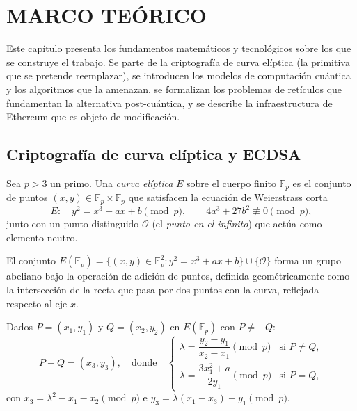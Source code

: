 \chapter{MARCO TEÓRICO}
\label{cap:marco_teorico}

Este capítulo presenta los fundamentos matemáticos y tecnológicos sobre los que se construye el trabajo. Se parte de la criptografía de curva elíptica (la primitiva que se pretende reemplazar), se introducen los modelos de computación cuántica y los algoritmos que la amenazan, se formalizan los problemas de retículos que fundamentan la alternativa post-cuántica, y se describe la infraestructura de Ethereum que es objeto de modificación.

\section{Criptografía de curva elíptica y ECDSA}
\label{sec:ecdsa}

\begin{definicion}
Sea $p > 3$ un primo. Una \emph{curva elíptica} $E$ sobre el cuerpo finito $\mathbb{F}_p$ es el conjunto de puntos $(x, y) \in \mathbb{F}_p \times \mathbb{F}_p$ que satisfacen la ecuación de Weierstrass corta
\begin{equation}
  E: \quad y^2 = x^3 + ax + b \pmod{p}, \qquad 4a^3 + 27b^2 \not\equiv 0 \pmod{p},
  \label{eq:curva_eliptica}
\end{equation}
junto con un punto distinguido $\mathcal{O}$ (el \emph{punto en el infinito}) que actúa como elemento neutro.
\end{definicion}

El conjunto $E(\mathbb{F}_p) = \{(x,y) \in \mathbb{F}_p^2 : y^2 = x^3 + ax + b\} \cup \{\mathcal{O}\}$ forma un grupo abeliano bajo la operación de adición de puntos, definida geométricamente como la intersección de la recta que pasa por dos puntos con la curva, reflejada respecto al eje $x$.

\begin{definicion}
Dados $P = (x_1, y_1)$ y $Q = (x_2, y_2)$ en $E(\mathbb{F}_p)$ con $P \neq -Q$:
\begin{equation}
  P + Q = (x_3, y_3), \quad \text{donde} \quad
  \begin{cases}
    \lambda = \dfrac{y_2 - y_1}{x_2 - x_1} \pmod{p} & \text{si } P \neq Q, \\[8pt]
    \lambda = \dfrac{3x_1^2 + a}{2y_1} \pmod{p} & \text{si } P = Q,
  \end{cases}
  \label{eq:suma_puntos}
\end{equation}
con $x_3 = \lambda^2 - x_1 - x_2 \pmod{p}$ e $y_3 = \lambda(x_1 - x_3) - y_1 \pmod{p}$.
\end{definicion}

